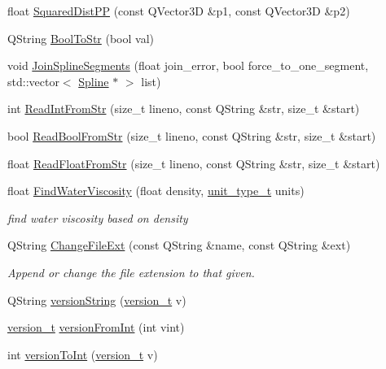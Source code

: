 \begin{DoxyCompactItemize}
\item 
float \hyperlink{namespaceShipCAD_a6f9f5ac15e7e2821bba27ba06827a4e1}{Squared\-Dist\-P\-P} (const Q\-Vector3\-D \&p1, const Q\-Vector3\-D \&p2)
\item 
Q\-String \hyperlink{namespaceShipCAD_a45ba7de6922e89cbddf2a4c9c810a2e4}{Bool\-To\-Str} (bool val)
\item 
void \hyperlink{namespaceShipCAD_a53d65cdf2cebdb1cb67e56417cf203bd}{Join\-Spline\-Segments} (float join\-\_\-error, bool force\-\_\-to\-\_\-one\-\_\-segment, std\-::vector$<$ \hyperlink{classShipCAD_1_1Spline}{Spline} $\ast$ $>$ list)
\item 
int \hyperlink{namespaceShipCAD_a70b238d926183460670b82d9680b5cb9}{Read\-Int\-From\-Str} (size\-\_\-t lineno, const Q\-String \&str, size\-\_\-t \&start)
\item 
bool \hyperlink{namespaceShipCAD_af343b5a2dfd09b32b9451d35e0676384}{Read\-Bool\-From\-Str} (size\-\_\-t lineno, const Q\-String \&str, size\-\_\-t \&start)
\item 
float \hyperlink{namespaceShipCAD_a696bc38864a736dda734802f3cda4346}{Read\-Float\-From\-Str} (size\-\_\-t lineno, const Q\-String \&str, size\-\_\-t \&start)
\item 
float \hyperlink{namespaceShipCAD_a44025ef38e6ee9f12cbf032660f637b5}{Find\-Water\-Viscosity} (float density, \hyperlink{namespaceShipCAD_ac6a7a28b4b063771afae92decb602da5}{unit\-\_\-type\-\_\-t} units)
\begin{DoxyCompactList}\small\item\em find water viscosity based on density \end{DoxyCompactList}\item 
Q\-String \hyperlink{namespaceShipCAD_ae416df4a72579eb3a1a418b19551eb53}{Change\-File\-Ext} (const Q\-String \&name, const Q\-String \&ext)
\begin{DoxyCompactList}\small\item\em Append or change the file extension to that given. \end{DoxyCompactList}\item 
Q\-String \hyperlink{namespaceShipCAD_a2901c6bb3e9ddd7efa9bdcc9095cc468}{version\-String} (\hyperlink{namespaceShipCAD_af3a6fa23a7318acbda7b0066b53d694f}{version\-\_\-t} v)
\item 
\hyperlink{namespaceShipCAD_af3a6fa23a7318acbda7b0066b53d694f}{version\-\_\-t} \hyperlink{namespaceShipCAD_aaacff40f3706c270a66e4c8296d17ebd}{version\-From\-Int} (int vint)
\item 
int \hyperlink{namespaceShipCAD_ad78a3ea3f966f52a2aa9befd3bfc73b0}{version\-To\-Int} (\hyperlink{namespaceShipCAD_af3a6fa23a7318acbda7b0066b53d694f}{version\-\_\-t} v)
\end{DoxyCompactItemize}
